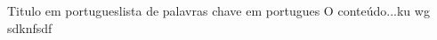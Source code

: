 %
%



\begin{englishabstract}{Titulo em portugues}{lista de palavras chave em portugues}
O conteúdo...ku wg sdknfsdf

\end{englishabstract}

